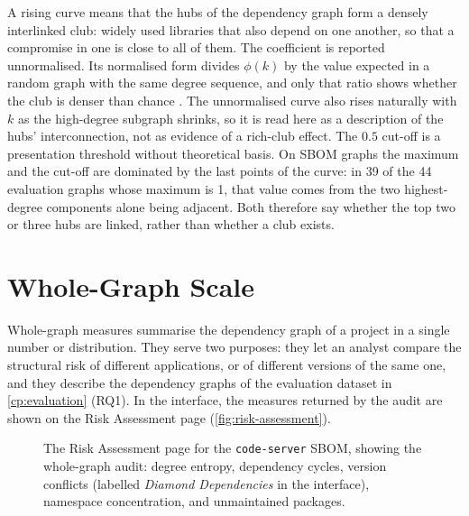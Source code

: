 A rising curve means that the hubs of the dependency graph form a densely interlinked club: widely used libraries that also depend on one another, so that a compromise in one is close to all of them. The coefficient is reported unnormalised. Its normalised form divides \(\phi(k)\) by the value expected in a random graph with the same degree sequence, and only that ratio shows whether the club is denser than chance \citep{Colizza2006}. The unnormalised curve also rises naturally with \(k\) as the high-degree subgraph shrinks, so it is read here as a description of the hubs' interconnection, not as evidence of a rich-club effect. The \(0.5\) cut-off is a presentation threshold without theoretical basis. On SBOM graphs the maximum and the cut-off are dominated by the last points of the curve: in 39 of the 44 evaluation graphs whose maximum is 1, that value comes from the two highest-degree components alone being adjacent. Both therefore say whether the top two or three hubs are linked, rather than whether a club exists.


\section{Whole-Graph Scale}
\label{sec:structural-risk}

Whole-graph measures summarise the dependency graph of a project in a single number or distribution. They serve two purposes: they let an analyst compare the structural risk of different applications, or of different versions of the same one, and they describe the dependency graphs of the evaluation dataset in \autoref{cp:evaluation} (RQ1). In the interface, the measures returned by the audit are shown on the Risk Assessment page (\autoref{fig:risk-assessment}).

\begin{figure}[!htpb]
    \centering
    \caption[The Risk Assessment page]{The Risk Assessment page for the \texttt{code-server} SBOM, showing the whole-graph audit: degree entropy, dependency cycles, version conflicts (labelled \emph{Diamond Dependencies} in the interface), namespace concentration, and unmaintained packages.}
    \label{fig:risk-assessment}
\end{figure}


